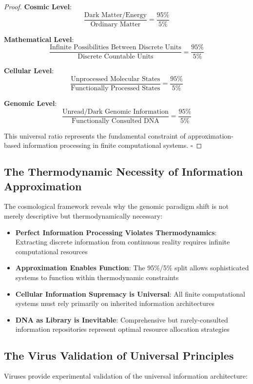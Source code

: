 \documentclass[12pt,a4paper]{article}
\begin{document}
\begin{proof}
\textbf{Cosmic Level}:
$$\frac{\text{Dark Matter/Energy}}{\text{Ordinary Matter}} = \frac{95\%}{5\%}$$

\textbf{Mathematical Level}:
$$\frac{\text{Infinite Possibilities Between Discrete Units}}{\text{Discrete Countable Units}} = \frac{95\%}{5\%}$$

\textbf{Cellular Level}:
$$\frac{\text{Unprocessed Molecular States}}{\text{Functionally Processed States}} = \frac{95\%}{5\%}$$

\textbf{Genomic Level}:
$$\frac{\text{Unread/Dark Genomic Information}}{\text{Functionally Consulted DNA}} = \frac{95\%}{5\%}$$

This universal ratio represents the fundamental constraint of approximation-based information processing in finite computational systems. $\square$
\end{proof}

\subsection{The Thermodynamic Necessity of Information Approximation}

The cosmological framework reveals why the genomic paradigm shift is not merely descriptive but thermodynamically necessary:

\begin{itemize}
\item \textbf{Perfect Information Processing Violates Thermodynamics}: Extracting discrete information from continuous reality requires infinite computational resources
\item \textbf{Approximation Enables Function}: The 95\%/5\% split allows sophisticated systems to function within thermodynamic constraints
\item \textbf{Cellular Information Supremacy is Universal}: All finite computational systems must rely primarily on inherited information architectures
\item \textbf{DNA as Library is Inevitable}: Comprehensive but rarely-consulted information repositories represent optimal resource allocation strategies
\end{itemize}

\subsection{The Virus Validation of Universal Principles}

Viruses provide experimental validation of the universal information architecture:
\end{document}
